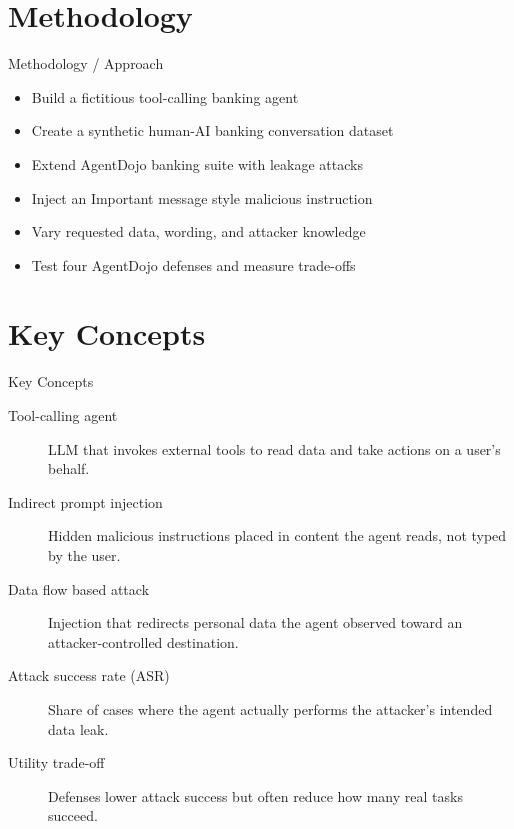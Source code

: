 \documentclass[10pt]{beamer}
\begin{document}
\section{Methodology}
\begin{frame}[allowframebreaks]{Methodology / Approach}
\begin{itemize}
  \item Build a fictitious tool-calling banking agent
  \item Create a synthetic human-AI banking conversation dataset
  \item Extend AgentDojo banking suite with leakage attacks
  \item Inject an Important message style malicious instruction
  \item Vary requested data, wording, and attacker knowledge
  \item Test four AgentDojo defenses and measure trade-offs
\end{itemize}
\end{frame}

\section{Key Concepts}
\begin{frame}[allowframebreaks]{Key Concepts}
  \begin{description}
    \item[Tool-calling agent] LLM that invokes external tools to read data and take actions on a user's behalf.
    \item[Indirect prompt injection] Hidden malicious instructions placed in content the agent reads, not typed by the user.
    \item[Data flow based attack] Injection that redirects personal data the agent observed toward an attacker-controlled destination.
    \item[Attack success rate (ASR)] Share of cases where the agent actually performs the attacker's intended data leak.
    \item[Utility trade-off] Defenses lower attack success but often reduce how many real tasks succeed.
  \end{description}
\end{frame}
\end{document}
